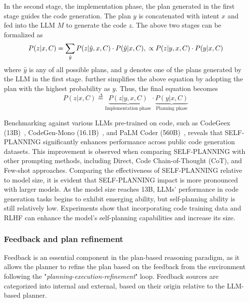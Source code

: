 In the second stage, the implementation phase, the plan generated in the first stage guides the code generation.
The plan $y$ is concatenated with intent $x$ and fed into the LLM $M$ to generate the code $z$.
The above two stages can be formalized as
\begin{equation}
	P(z|x, C) = \sum_{\hat{y}}{P(z|\hat{y}, x, C) \cdot P(\hat{y}|x, C)},\\
	\propto P(z|y, x, C) \cdot P(y|x, C)
	\label{eq:self-planning-all}
\end{equation}
where $\hat{y}$ is any of all possible plans, and $y$ denotes one of the plans generated by the LLM in the first stage.
\textcite{jiang2024selfplanning} further simplifies the above equation by adopting the plan with the highest probability as $y$.
Thus, the final equation becomes
\begin{equation}
	P(z|x, C) \stackrel{\Delta}{=} \underbrace{P(z|y, x, C)}_\text{Implementation phase} \cdot \underbrace{P(y|x, C)}_\text{Planning phase}
	\label{eq:self-planning-final}
\end{equation}

Benchmarking against various LLMs pre-trained on code, such as CodeGeex (13B)~\cite{zheng2023codegeex}, CodeGen-Mono (16.1B)~\cite{nijkamp2022codegen}, and PaLM Coder (560B)~\cite{chung2022scaling}, reveals that SELF-PLANNING significantly enhances performance across public code generation datasets.
This improvement is observed when comparing SELF-PLANNING with other prompting methods, including Direct, Code Chain-of-Thought (CoT), and Few-shot approaches.
Comparing the effectiveness of SELF-PLANNING relative to model size, it is evident that SELF-PLANNING impact is more pronounced with larger models.
As the model size reaches 13B, LLMs' performance in code generation tasks begins to exhibit emerging ability, but self-planning ability is still relatively low.
Experiments show that incorporating code training data and RLHF can enhance the model’s self-planning capabilities and increase its size.

\subsubsection{Feedback and plan refinement}
\label{subsubsec:feedback}

Feedback is an essential component in the plan-based reasoning paradigm, as it allows the planner to refine the plan based on the feedback from the environment following the "\textit{planning-execution-refinement}" loop.
Feedback sources are categorized into internal and external, based on their origin relative to the LLM-based planner.

